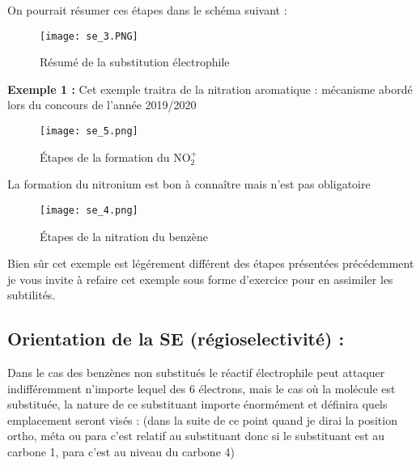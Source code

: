 \documentclass[a4paper, oneside]{book}
\begin{document}
On pourrait résumer ces étapes dans le schéma suivant :
\begin{figure}[!h]
    \centering
    \texttt{[image: se\_3.PNG]}
    \caption{Résumé de la substitution électrophile}
    \label{fig:my_label}
\end{figure}
\newpage
\textbf{Exemple 1 :} Cet exemple traitra de la nitration aromatique : mécanisme abordé lors du concours de l'année 2019/2020 
\begin{figure}[!h]
    \centering
    \texttt{[image: se\_5.png]}
    \caption{\'Etapes de la formation du NO$_2^+$}
    \label{fig:my_label}
\end{figure}

La formation du nitronium est bon à connaître mais n'est pas obligatoire
\begin{figure}[!h]
    \centering
    \texttt{[image: se\_4.png]}
    \caption{\'Etapes de la nitration du benzène}
    \label{fig:my_label}
\end{figure}

Bien sûr cet exemple est légérement différent des étapes présentées précédemment je vous invite à refaire cet exemple sous forme d'exercice pour en assimiler les subtilités.
\subsection{Orientation de la SE (régioselectivité) :}
Dans le cas des benzènes non substitués le réactif électrophile peut attaquer indifféremment n'importe lequel des 6 électrons, mais le cas où la molécule est substituée, la nature de ce substituant importe énormément et définira quels emplacement seront visés : (dans la suite de ce point quand je dirai la position ortho, méta ou para c'est relatif au substituant donc si le substituant est au carbone 1, para c'est au niveau du carbone 4)
\end{document}
